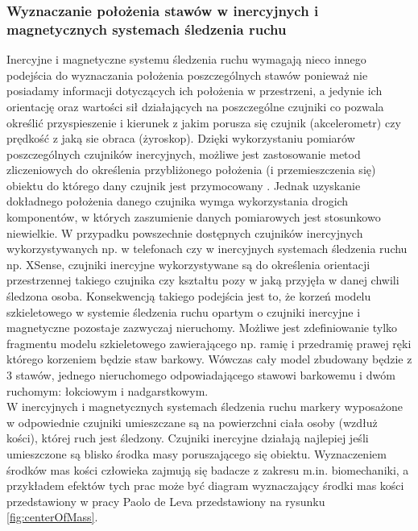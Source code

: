 \subsubsection*{Wyznaczanie położenia stawów w inercyjnych i magnetycznych systemach śledzenia ruchu}
Inercyjne i magnetyczne systemu śledzenia ruchu wymagają nieco innego podejścia do wyznaczania położenia poszczególnych stawów ponieważ nie posiadamy informacji dotyczących ich położenia w przestrzeni, a jedynie ich orientację oraz wartości sił działających na poszczególne czujniki co pozwala określić przyspieszenie i kierunek z jakim porusza się czujnik (akcelerometr) czy prędkość z jaką sie obraca (żyroskop). Dzięki wykorzystaniu pomiarów poszczególnych czujników inercyjnych, możliwe jest zastosowanie metod zliczeniowych do określenia przybliżonego położenia (i przemieszczenia się) obiektu do którego dany czujnik jest przymocowany \cite{HyeRiPark2009, Montorsi2013b}. Jednak uzyskanie dokładnego położenia danego czujnika wymga wykorzystania drogich komponentów, w których zaszumienie danych pomiarowych jest stosunkowo niewielkie. W przypadku powszechnie dostępnych czujników inercyjnych wykorzystywanych np. w telefonach czy w inercyjnych systemach śledzenia ruchu np. XSense, czujniki inercyjne wykorzystywane są do określenia orientacji przestrzennej takiego czujnika czy kształtu pozy w jaką przyjęła w danej chwili śledzona osoba. Konsekwencją takiego podejścia jest to, że korzeń modelu szkieletowego w systemie śledzenia ruchu opartym o czujniki inercyjne i magnetyczne pozostaje zazwyczaj nieruchomy. Możliwe jest zdefiniowanie tylko fragmentu modelu szkieletowego zawierającego np. ramię i przedramię prawej ręki którego korzeniem będzie staw barkowy. Wówczas cały model zbudowany będzie z 3 stawów, jednego nieruchomego odpowiadającego stawowi barkowemu i dwóm ruchomym: łokciowym i nadgarstkowym.\\
		
W inercyjnych i magnetycznych systemach śledzenia ruchu markery wyposażone w odpowiednie czujniki umieszczane są na powierzchni ciała osoby (wzdłuż kości), której ruch jest śledzony. Czujniki inercyjne działają najlepiej jeśli umieszczone są blisko środka masy poruszającego się obiektu. Wyznaczeniem środków mas kości człowieka zajmują się badacze z zakresu m.in. biomechaniki, a przykładem efektów tych prac może być diagram wyznaczający środki mas kości przedstawiony w pracy Paolo de Leva \cite{DeLeva1996} przedstawiony na rysunku \ref{fig:centerOfMass}.\\
		
